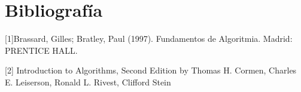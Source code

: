 \documentclass[12pt,twoside]{article}
\begin{document}
\section{Bibliograf\'ia}

[1]Brassard, Gilles; Bratley, Paul (1997). Fundamentos de Algoritmia. Madrid: PRENTICE HALL.

[2] Introduction to Algorithms, Second Edition by Thomas H. Cormen, Charles E. Leiserson, Ronald L. Rivest, Clifford Stein
\end{document}
